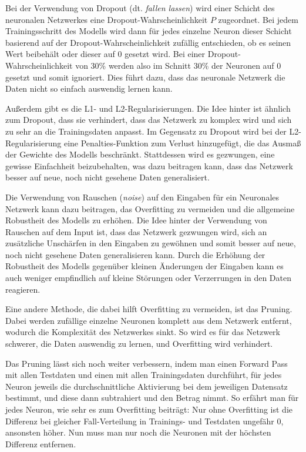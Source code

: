 \documentclass[10pt]{article}
\newcommand{\eng}[1]{\textit{#1}}
\newcommand{\feng}[1]{{#1}}
\begin{document}
Bei der Verwendung von Dropout (dt. \textit{fallen lassen}) wird einer Schicht des neuronalen Netzwerkes eine Dropout-Wahrscheinlichkeit $P$ zugeordnet.
Bei jedem Trainingsschritt des Modells wird dann für jedes einzelne Neuron dieser Schicht basierend auf der Dropout-Wahrscheinlichkeit zufällig entschieden, ob es seinen Wert beibehält oder dieser auf 0 gesetzt wird. 
Bei einer Dropout-Wahrscheinlichkeit von 30\% werden also im Schnitt 30\% der Neuronen auf 0 gesetzt und somit ignoriert.  %
Dies führt dazu, dass das neuronale Netzwerk die Daten nicht so einfach auswendig lernen kann. %

Außerdem gibt es die L1- und L2-Regularisierungen.  
Die Idee hinter ist ähnlich zum Dropout, dass sie verhindert, dass das Netzwerk zu komplex wird und sich zu sehr an die Trainingsdaten anpasst.
Im Gegensatz zu \feng{Dropout} wird bei der L2-Regularisierung eine Penalties-Funktion zum Verlust hinzugefügt, die das Ausmaß der Gewichte des Modells beschränkt. Stattdessen wird es gezwungen, eine gewisse Einfachheit beizubehalten, was dazu beitragen kann, dass das Netzwerk besser auf neue, noch nicht gesehene Daten generalisiert.

Die Verwendung von Rauschen (\eng{noise}) auf den Eingaben für ein Neuronales Netzwerk kann dazu beitragen, das Overfitting zu vermeiden und die allgemeine Robustheit des Modells zu erhöhen.
Die Idee hinter der Verwendung von Rauschen auf dem Input ist, dass das Netzwerk gezwungen wird, sich an zusätzliche Unschärfen in den Eingaben zu gewöhnen und somit besser auf neue, noch nicht gesehene Daten generalisieren kann. Durch die Erhöhung der Robustheit des Modells gegenüber kleinen Änderungen der Eingaben kann es auch weniger empfindlich auf kleine Störungen oder Verzerrungen in den Daten reagieren.

Eine andere Methode, die dabei hilft Overfitting zu vermeiden, ist das Pruning.
Dabei werden zufällige einzelne Neuronen komplett aus dem Netzwerk entfernt, wodurch die Komplexität des Netzwerkes sinkt. 
So wird es für das Netzwerk schwerer, die Daten auswendig zu lernen, und Overfitting wird verhindert.

Das Pruning lässt sich noch weiter verbessern, indem man einen Forward Pass mit allen Testdaten und einen mit allen Trainingsdaten durchführt, für jedes Neuron jeweils die durchschnittliche Aktivierung bei dem jeweiligen Datensatz bestimmt, und diese dann subtrahiert und den Betrag nimmt.
So erfährt man für jedes Neuron, wie sehr es zum Overfitting beiträgt: Nur ohne Overfitting ist die Differenz bei gleicher Fall-Verteilung in Trainings- und Testdaten ungefähr 0, ansonsten höher.
Nun muss man nur noch die Neuronen mit der höchsten Differenz entfernen.
\end{document}
